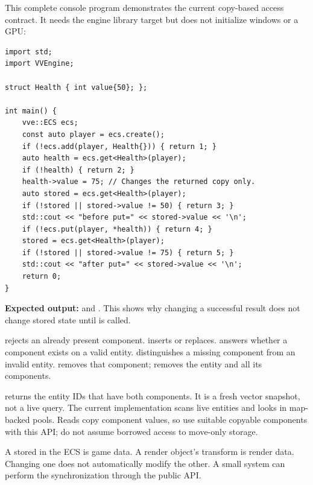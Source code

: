 \documentclass[11pt,a4paper]{article}
\begin{document}
This complete console program demonstrates the current copy-based access contract. It needs the engine library target but does not initialize windows or a GPU:
\begin{lstlisting}
import std;
import VVEngine;

struct Health { int value{50}; };

int main() {
    vve::ECS ecs;
    const auto player = ecs.create();
    if (!ecs.add(player, Health{})) { return 1; }
    auto health = ecs.get<Health>(player);
    if (!health) { return 2; }
    health->value = 75; // Changes the returned copy only.
    auto stored = ecs.get<Health>(player);
    if (!stored || stored->value != 50) { return 3; }
    std::cout << "before put=" << stored->value << '\n';
    if (!ecs.put(player, *health)) { return 4; }
    stored = ecs.get<Health>(player);
    if (!stored || stored->value != 75) { return 5; }
    std::cout << "after put=" << stored->value << '\n';
    return 0;
}
\end{lstlisting}
\textbf{Expected output:}  and . This shows why changing a successful  result does not change stored state until  is called.

 rejects an already present component.  inserts or replaces.  answers whether a component exists on a valid entity.  distinguishes a missing component from an invalid entity.  removes that component;  removes the entity and all its components.

 returns the entity IDs that have both components. It is a fresh vector snapshot, not a live query. The current implementation scans live entities and looks in map-backed pools. Reads copy component values, so use suitable copyable components with this API; do not assume borrowed access to move-only storage.

A  stored in the ECS is game data. A render object's transform is render data. Changing one does not automatically modify the other. A small system can perform the synchronization through the public API.
\end{document}
